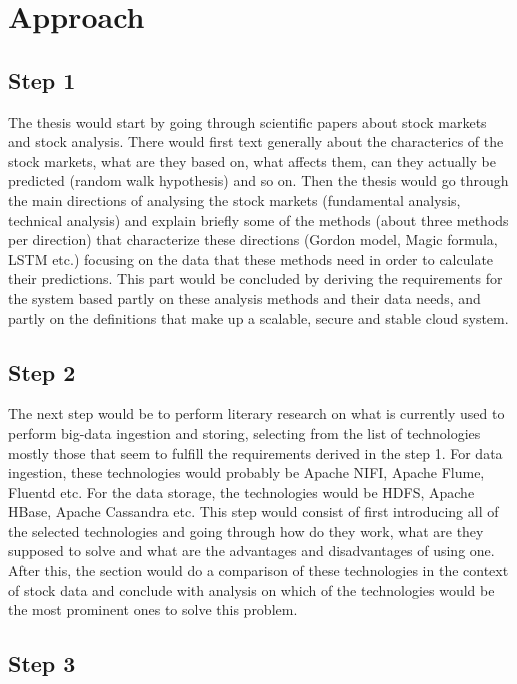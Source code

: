 \documentclass[article,11pt]{article}
\begin{document}
\section{Approach}

\subsection*{Step 1}

The thesis would start by going through scientific papers about stock markets and stock analysis. There would first text generally about the characterics of the stock markets, what are they based on, what affects them, can they actually be predicted (random walk hypothesis) and so on. Then the thesis would go through the main directions of analysing the stock markets (fundamental analysis, technical analysis) and explain briefly some of the methods (about three methods per direction) that characterize these directions (Gordon model, Magic formula, LSTM etc.) focusing on the data that these methods need in order to calculate their predictions. This part would be concluded by deriving the requirements for the system based partly on these analysis methods and their data needs, and partly on the definitions that make up a scalable, secure and stable cloud system. 

\subsection*{Step 2}

The next step would be to perform literary research on what is currently used to perform big-data ingestion and storing, selecting from the list of technologies mostly those that seem to fulfill the requirements derived in the step 1. For data ingestion, these technologies would probably be Apache NIFI, Apache Flume, Fluentd etc. For the data storage, the technologies would be HDFS, Apache HBase, Apache Cassandra etc. This step would consist of first introducing all of the selected technologies and going through how do they work, what are they supposed to solve and what are the advantages and disadvantages of using one. After this, the section would do a comparison of these technologies in the context of stock data and conclude with analysis on which of the technologies would be the most prominent ones to solve this problem.

\subsection*{Step 3}
\end{document}
